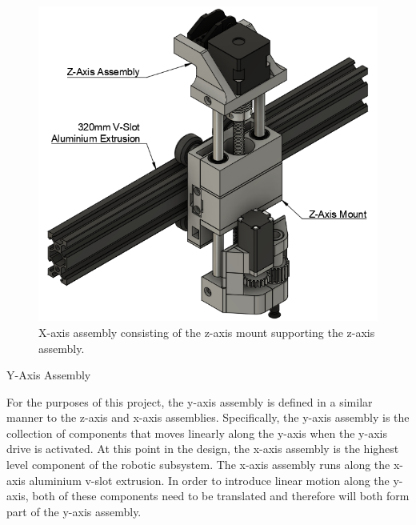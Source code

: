 \begin{figure}[H]
	\centering
	\includegraphics[width=0.8\linewidth]{figures/x-axis-assembly.png}
	\caption{X-axis assembly consisting of the z-axis mount supporting the z-axis assembly.}
	\label{fig:x-axis-assembly}
\end{figure}

Y-Axis Assembly

For the purposes of this project, the y-axis assembly is defined in a similar manner to the z-axis and x-axis assemblies. Specifically, the y-axis assembly is the collection of components that moves linearly along the y-axis when the y-axis drive is activated. At this point in the design, the x-axis assembly is the highest level component of the robotic subsystem. The x-axis assembly runs along the x-axis aluminium v-slot extrusion. In order to introduce linear motion along the y-axis, both of these components need to be translated and therefore will both form part of the y-axis assembly.

